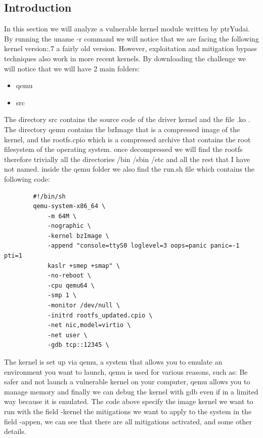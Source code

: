     \subsection{Introduction}
    In this section we will analyze a vulnerable kernel module written by ptrYudai\cite{PWNYABLE}.\newline
    By running the uname -r command we will notice that we are facing the following kernel version:.7 a fairly old version.\newline
    However, exploitation and mitigation bypass techniques also work in more recent kernels.\newline
    By downloading the challenge we will notice that we will have 2 main folders:\newline
    \begin{itemize}
        \item qemu 
        \item src 
    \end{itemize}
    The directory src contains the source code of the driver kernel and the file .ko .\newline
    The directory qemu contains the bzImage that is a compressed image of the kernel, and the rootfs.cpio which is a compressed archive that contains the root filesystem of the operating system.\newline
    once decompressed we will find the rootfs therefore trivially all the directories /bin /sbin /etc and all the rest that I have not named. \newline
    inside the qemu folder we also find the run.sh file which contains the following code:\newline
    \clearpage
    \begin{verbatim}
        #!/bin/sh
        qemu-system-x86_64 \
            -m 64M \
            -nographic \
            -kernel bzImage \
            -append "console=ttyS0 loglevel=3 oops=panic panic=-1 pti=1
            kaslr +smep +smap" \
            -no-reboot \
            -cpu qemu64 \
            -smp 1 \
            -monitor /dev/null \
            -initrd rootfs_updated.cpio \
            -net nic,model=virtio \
            -net user \
            -gdb tcp::12345 \
    \end{verbatim}
    The kernel is set up via qemu, a system that allows you to emulate an environment you want to launch, qemu is used for various reasons, such as:\newline
    Be safer and not launch a vulnerable kernel on your computer, qemu allows you to manage memory and finally we can debug the kernel with gdb even if in a limited way because it is emulated.\newline
    The code above specify the image kernel we want to run with the field -kernel the mitigations we want to apply to the system in the field -appen, we can see that there are all mitigations activated, and some other details.\newline

